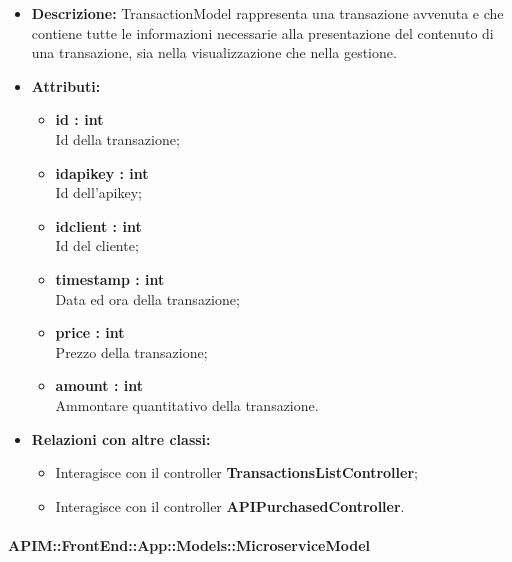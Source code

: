 \begin{itemize}
	\item \textbf{Descrizione:} TransactionModel rappresenta una transazione avvenuta e che contiene
tutte le informazioni necessarie alla presentazione del contenuto di una transazione,
sia nella visualizzazione che nella gestione.
	\item \textbf{Attributi:}
		\begin{itemize}
			\item \textbf{id : int}\\
			Id della transazione;
			\item \textbf{idapikey : int}\\
			Id dell'apikey;
			\item \textbf{idclient : int}\\
			Id del cliente;
			\item \textbf{timestamp : int}\\
			Data ed ora della transazione;
			\item \textbf{price : int}\\
			Prezzo della transazione;
			\item \textbf{amount : int}\\
			Ammontare quantitativo della transazione.
		\end{itemize}
	\item \textbf{Relazioni con altre classi:}
		\begin{itemize}
			\item Interagisce con il controller \textbf{TransactionsListController};
			\item Interagisce con il controller \textbf{APIPurchasedController}.
		\end{itemize}
\end{itemize}

\paragraph{APIM::FrontEnd::App::Models::MicroserviceModel}

